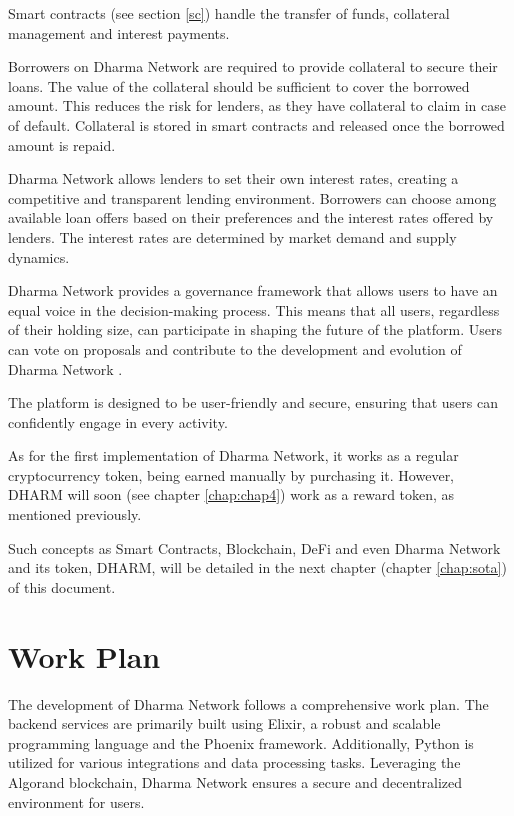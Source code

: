 Smart contracts (see section \ref{sc}) handle the transfer of funds, collateral management and interest payments.\newline

Borrowers on Dharma Network are required to provide collateral to secure their loans. The value of the collateral should be sufficient to cover the borrowed amount. This reduces the risk for lenders, as they have collateral to claim in case of default. Collateral is stored in smart contracts and released once the borrowed amount is repaid.\newline

Dharma Network allows lenders to set their own interest rates, creating a competitive and transparent lending environment. Borrowers can choose among available loan offers based on their preferences and the interest rates offered by lenders. The interest rates are determined by market demand and supply dynamics.\newline

Dharma Network provides a governance framework that allows users to have an equal voice in the decision-making process. This means that all users, regardless of their holding size, can participate in shaping the future of the platform. Users can vote on proposals and contribute to the development and evolution of Dharma Network \cite{dharma}.\newline

The platform is designed to be user-friendly and secure, ensuring that users can confidently engage in every activity.\newline

As for the first implementation of Dharma Network, it works as a regular cryptocurrency token, being earned manually by purchasing it. However, DHARM will soon (see chapter \ref{chap:chap4}) work as a reward token, as mentioned previously.\newline

Such concepts as Smart Contracts, Blockchain, DeFi and even Dharma Network and its token, DHARM, will be detailed in the next chapter (chapter \ref{chap:sota}) of this document.

\section{Work Plan} \label{sec:plan}

The development of Dharma Network follows a comprehensive work plan. The backend services are primarily built using Elixir, a robust and scalable programming language and the Phoenix framework. Additionally, Python is utilized for various integrations and data processing tasks. Leveraging the Algorand blockchain, Dharma Network ensures a secure and decentralized environment for users.

